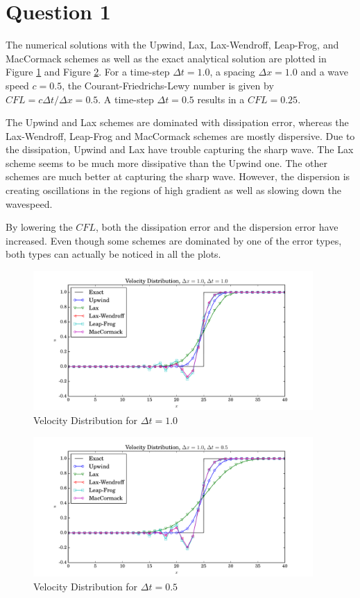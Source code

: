 \documentclass[letterpaper,12pt,]{article}
\begin{document}


\section*{Question 1}

The numerical solutions with the Upwind, Lax, Lax-Wendroff, Leap-Frog, and MacCormack schemes as well as the exact analytical solution are plotted in Figure \ref{fig:q11} and Figure \ref{fig:q12}.
For a time-step $\Delta t = 1.0$, a spacing $\Delta x = 1.0$ and a wave speed $c=0.5$, the Courant-Friedrichs-Lewy number is given by $CFL = c \Delta t / \Delta x = 0.5$.
A time-step $\Delta t = 0.5$ results in a $CFL = 0.25$.

The Upwind and Lax schemes are dominated with dissipation error, whereas the Lax-Wendroff, Leap-Frog and MacCormack schemes are mostly dispersive.
Due to the dissipation, Upwind and Lax have trouble capturing the sharp wave. The Lax scheme seems to be much more dissipative than the Upwind one.
The other schemes are much better at capturing the sharp wave.
However, the dispersion is creating oscillations in the regions of high gradient as well as slowing down the wavespeed.

By lowering the $CFL$, both the dissipation error and the dispersion error have increased.
Even though some schemes are dominated by one of the error types, both types can actually be noticed in all the plots.

\begin{figure}[!h]
    \centering
    \includegraphics[width = 0.95\textwidth]{./Figures/q1_1}
    \caption{Velocity Distribution for $\Delta t = 1.0$}
    \label{fig:q11}
\end{figure}
\begin{figure}[!h]
    \centering
    \includegraphics[width = 0.95\textwidth]{./Figures/q1_2}
    \caption{Velocity Distribution for $\Delta t = 0.5$}
    \label{fig:q12}
\end{figure}
\end{document}
